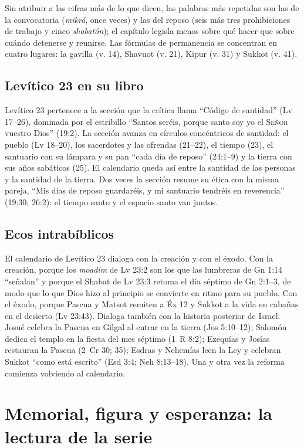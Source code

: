 \documentclass[11pt,letterpaper]{article}
\newcommand{\SENOR}{\textsc{Señor}}
\begin{document}
Sin atribuir a las cifras más de lo que dicen, las palabras más repetidas son las de la convocatoria (\emph{mikrá}, once veces) y las del reposo (seis más tres prohibiciones de trabajo y cinco \emph{shabatón}); el capítulo legisla menos sobre qué hacer que sobre cuándo detenerse y reunirse. Las fórmulas de permanencia se concentran en cuatro lugares: la gavilla (v. 14), Shavuot (v. 21), Kipur (v. 31) y Sukkot (v. 41).

\subsection{Levítico 23 en su libro}
Levítico 23 pertenece a la sección que la crítica llama ``Código de santidad'' (Lv 17--26), dominada por el estribillo ``Santos seréis, porque santo soy yo el \SENOR{} vuestro Dios'' (19:2). La sección avanza en círculos concéntricos de santidad: el pueblo (Lv 18--20), los sacerdotes y las ofrendas (21--22), el tiempo (23), el santuario con su lámpara y su pan ``cada día de reposo'' (24:1--9) y la tierra con sus años sabáticos (25). El calendario queda así entre la santidad de las personas y la santidad de la tierra. Dos veces la sección resume su ética con la misma pareja, ``Mis días de reposo guardaréis, y mi santuario tendréis en reverencia'' (19:30; 26:2): el tiempo santo y el espacio santo van juntos.

\subsection{Ecos intrabíblicos}
El calendario de Levítico 23 dialoga con la creación y con el éxodo. Con la creación, porque los \emph{moadim} de Lv 23:2 son los que las lumbreras de Gn 1:14 ``señalan'' y porque el Shabat de Lv 23:3 retoma el día séptimo de Gn 2:1--3, de modo que lo que Dios hizo al principio se convierte en ritmo para su pueblo. Con el éxodo, porque Pascua y Matsot remiten a Éx 12 y Sukkot a la vida en cabañas en el desierto (Lv 23:43). Dialoga también con la historia posterior de Israel: Josué celebra la Pascua en Gilgal al entrar en la tierra (Jos 5:10--12); Salomón dedica el templo en la fiesta del mes séptimo (1~R 8:2); Ezequías y Josías restauran la Pascua (2~Cr 30; 35); Esdras y Nehemías leen la Ley y celebran Sukkot ``como está escrito'' (Esd 3:4; Neh 8:13--18). Una y otra vez la reforma comienza volviendo al calendario.

\section{Memorial, figura y esperanza: la lectura de la serie}\label{sec:serie}
\end{document}
